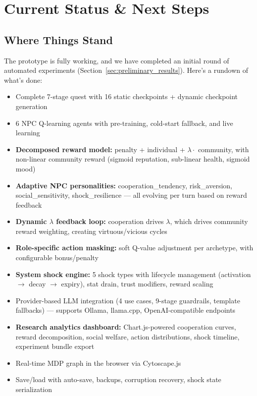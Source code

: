\section{Current Status \& Next Steps}
\label{sec:conclusion}

\subsection{Where Things Stand}

The prototype is fully working, and we have completed an initial round of automated experiments (Section~\ref{sec:preliminary_results}). Here's a rundown of what's done:

\begin{itemize}
    \item Complete 7-stage quest with 16 static checkpoints + dynamic checkpoint generation
    \item 6 NPC Q-learning agents with pre-training, cold-start fallback, and live learning
    \item \textbf{Decomposed reward model:} penalty + individual + $\lambda \cdot$ community, with non-linear community reward (sigmoid reputation, sub-linear health, sigmoid mood)
    \item \textbf{Adaptive NPC personalities:} cooperation\_tendency, risk\_aversion, social\_sensitivity, shock\_resilience --- all evolving per turn based on reward feedback
    \item \textbf{Dynamic $\lambda$ feedback loop:} cooperation drives $\lambda$, which drives community reward weighting, creating virtuous/vicious cycles
    \item \textbf{Role-specific action masking:} soft Q-value adjustment per archetype, with configurable bonus/penalty
    \item \textbf{System shock engine:} 5 shock types with lifecycle management (activation $\to$ decay $\to$ expiry), stat drain, trust modifiers, reward scaling
    \item Provider-based LLM integration (4 use cases, 9-stage guardrails, template fallbacks) --- supports Ollama, llama.cpp, OpenAI-compatible endpoints
    \item \textbf{Research analytics dashboard:} Chart.js-powered cooperation curves, reward decomposition, social welfare, action distributions, shock timeline, experiment bundle export
    \item Real-time MDP graph in the browser via Cytoscape.js
    \item Save/load with auto-save, backups, corruption recovery, shock state serialization

\end{itemize}
